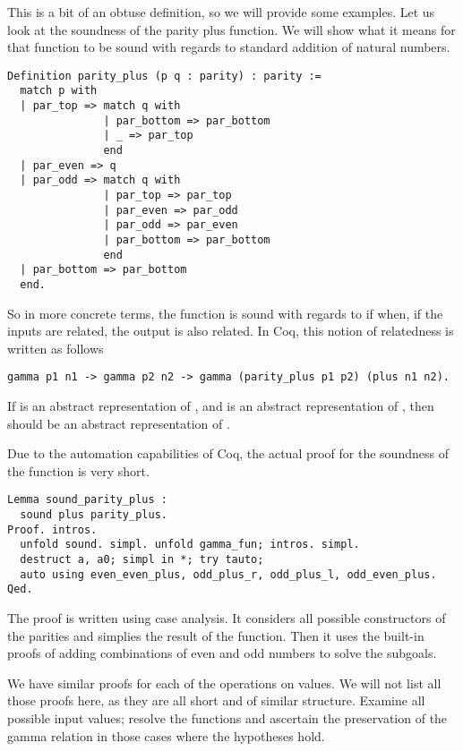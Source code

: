 This is a bit of an obtuse definition, so we will provide some examples. Let us
look at the soundness of the parity plus function. We will show what it
means for that function to be sound with regards to standard addition of
natural numbers.

\begin{verbatim}
Definition parity_plus (p q : parity) : parity :=
  match p with 
  | par_top => match q with
               | par_bottom => par_bottom
               | _ => par_top
               end
  | par_even => q
  | par_odd => match q with
               | par_top => par_top
               | par_even => par_odd
               | par_odd => par_even
               | par_bottom => par_bottom
               end
  | par_bottom => par_bottom
  end.
\end{verbatim}

So in more concrete terms, the function  is sound with 
regards to 
if when, if the inputs are related, the output is also related. In Coq, this 
notion of relatedness is written as follows

\begin{verbatim}
gamma p1 n1 -> gamma p2 n2 -> gamma (parity_plus p1 p2) (plus n1 n2).
\end{verbatim}

If  is an abstract representation of , and  is an 
abstract representation of , then  should be an 
abstract representation of . 

Due to the automation capabilities of Coq, the actual proof for the soundness
of the  function is very short.

\begin{verbatim}
Lemma sound_parity_plus :
  sound plus parity_plus.
Proof. intros.
  unfold sound. simpl. unfold gamma_fun; intros. simpl. 
  destruct a, a0; simpl in *; try tauto;
  auto using even_even_plus, odd_plus_r, odd_plus_l, odd_even_plus.
Qed.
\end{verbatim}

The proof is written using case analysis. It considers all possible
constructors of the parities and simplies the result of the 
function. Then it uses the built-in proofs of adding combinations of even and
odd numbers to solve the subgoals.

We have similar proofs for each of the operations on values. We will not list
all those proofs here, as they are all short and of similar structure. Examine
all possible input values; resolve the functions and ascertain the preservation
of the gamma relation in those cases where the hypotheses hold.

